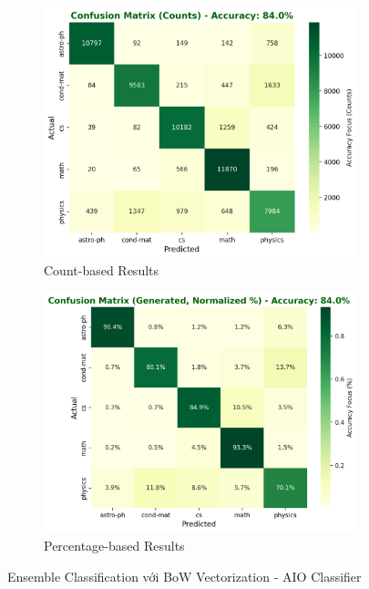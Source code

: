 \begin{figure}[H]
\centering
\begin{subfigure}{0.48\textwidth}
    \centering
    \includegraphics[width=\textwidth]{image/Ensemble_bow_count.png}
    \caption{Count-based Results}
    \label{fig:ensemble_bow_count_improvements}
\end{subfigure}
\hfill
\begin{subfigure}{0.48\textwidth}
    \centering
    \includegraphics[width=\textwidth]{image/Ensemble_bow_percent.png}
    \caption{Percentage-based Results}
    \label{fig:ensemble_bow_percent_improvements}
\end{subfigure}
\caption{Ensemble Classification với BoW Vectorization - AIO Classifier}
\label{fig:ensemble_bow_results_improvements}
\end{figure}

